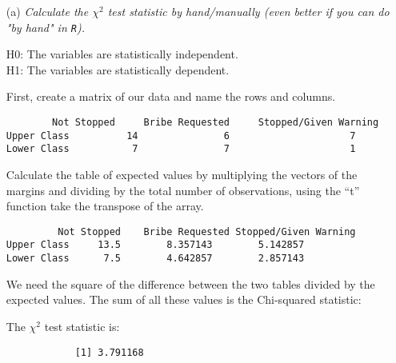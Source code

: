 \documentclass[12pt,letterpaper]{article}
\begin{document}
	\begin{enumerate}
		
		\newpage
		
		\item [(a)]
		\emph{Calculate the $\chi^2$ test statistic by hand/manually (even better if you can do "by hand" in \texttt{R}).}\\
		\vspace{.5cm}
		
		\noindent
		H0: The variables are statistically independent. \\
		H1: The variables are statistically dependent.\\
		\vspace{.5cm}
		
		First, create a matrix of our data and name the rows and columns.
		
		
		\begin{Verbatim} 
		Not Stopped     Bribe Requested     Stopped/Given Warning
Upper Class          14               6                     7
Lower Class           7               7                     1
		\end{Verbatim}
		\vspace{.5cm}
		
		\noindent   
		Calculate the table of expected values by multiplying the vectors of the margins and dividing by the total number of observations, using the “t” function take the transpose of the array.\\
		
		
		
		\begin{Verbatim} 
	     Not Stopped 	Bribe Requested	Stopped/Given Warning
Upper Class     13.5		8.357143		5.142857
Lower Class      7.5		4.642857		2.857143
		\end{Verbatim}
	\vspace{.2cm}
		
		
		\noindent We need the square of the difference between the two tables divided by the expected values. The sum of all these values is the Chi-squared statistic:
				\vspace{.2cm}
		
		\vspace{.2cm}
		\noindent The $\chi^2$ test statistic is:
		\begin{verbatim}  
			[1] 3.791168
		\end{verbatim}
		\vspace{.2cm}
		

\end{enumerate}
\end{document}
